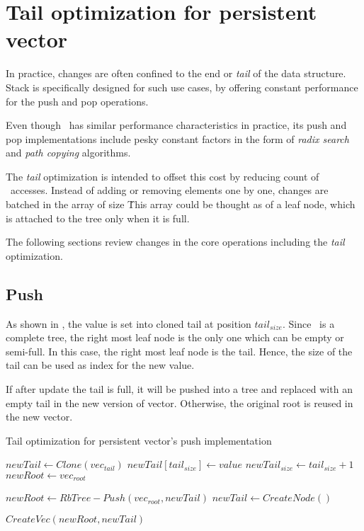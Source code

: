 \section{Tail optimization for persistent vector}

In practice, changes are often confined to the end or \emph{tail} of the data structure. Stack is specifically designed for such use cases, by offering constant performance for the push and pop operations. 

Even though \rbtree\ has similar performance characteristics in practice, its push and pop implementations include pesky constant factors in the form of \emph{radix search} and \emph{path copying} algorithms. 

The \emph{tail} optimization is intended to offset this cost by reducing count of \rbtree\ accesses. Instead of adding or removing elements one by one, changes are batched in the array of size \m\. This array could be thought as of  a leaf node, which is attached to the tree only when it is full. 

The following sections review changes in the core operations including the \emph{tail} optimization. 

\subsection*{Push}
As shown in , the value is set into cloned tail at position $tail_{size}$. Since \rbtree\ is a complete tree, the right most leaf node is the only one which can be empty or semi-full. In this case, the right most leaf node is the tail. Hence, the size of the tail can be used as index for the new value.

If after update the tail is full, it will be pushed into a tree and replaced with an empty tail in the new version of vector. Otherwise, the original root is reused in the new vector. 

\begin{listing}[ht!]        
    \caption{Tail optimization for persistent vector’s push implementation}
    \label{lst:pvec-push}
    
    \begin{algorithmic}
        \State $newTail \leftarrow Clone(vec_{tail})$
        \State $newTail[tail_{size}] \leftarrow value$
        \State $newTail_{size} \leftarrow tail_{size} + 1$
        \State $newRoot \leftarrow vec_{root}$
            
            \State $newRoot \leftarrow RbTree-Push(vec_{root}, newTail)$
            \State $newTail \leftarrow CreateNode()$        
        \EndIf
        
        \State \Return $CreateVec(newRoot, newTail)$
        \EndFunction
    \end{algorithmic}
\end{listing}